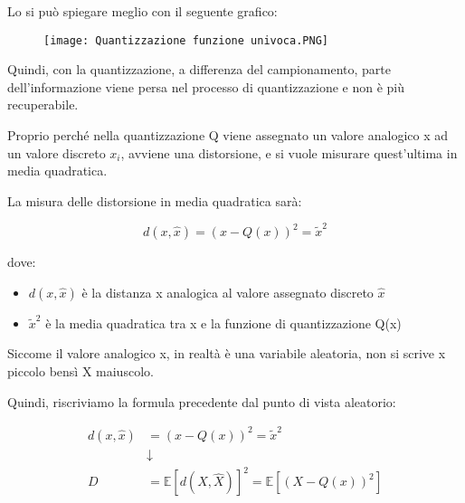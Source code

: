 Lo si può spiegare meglio con il seguente grafico: 

\begin{figure}[h]
    \centering
    \texttt{[image: Quantizzazione funzione univoca.PNG]}
\end{figure} 

Quindi, con la quantizzazione, a differenza del campionamento, parte dell'informazione viene persa nel processo di quantizzazione e non è più recuperabile. \newline 

Proprio perché nella quantizzazione Q viene assegnato un valore analogico x ad un valore discreto $x_i$, 
avviene una distorsione, e si vuole misurare quest'ultima in media quadratica. \newline 

La misura delle distorsione in media quadratica sarà: 

{
    \Large 
    \begin{equation}
            d( x, \hat{x}) 
            = 
            (x - Q(x))^{2}
            = 
            \tilde{x}^{2}
    \end{equation}
}

dove: 

\begin{itemize}
    \item $d(x, \hat{x})$ è la distanza x analogica al valore assegnato discreto $\hat{x}$
    \item $\tilde{x}^{2}$ è la media quadratica tra x e la funzione di quantizzazione Q(x)
\end{itemize}

Siccome il valore analogico x, in realtà è una variabile aleatoria, non si scrive x piccolo bensì X maiuscolo. \newline 

Quindi, riscriviamo la formula precedente dal punto di vista aleatorio: 

{
    \Large 
    \begin{equation}
        \begin{split}
          d( x, \hat{x}) 
            &= 
            (x - Q(x))^{2}
            = 
            \tilde{x}^{2} 
            \\
            &\downarrow
            \\
            D 
            &=
            \mathbb{E} 
            \left[d (X , \hat{X}) \right]^{2}
            = 
            \mathbb{E} 
            \left[ (X - Q(x) )^{2} \right] 
        \end{split}
    \end{equation}
}

